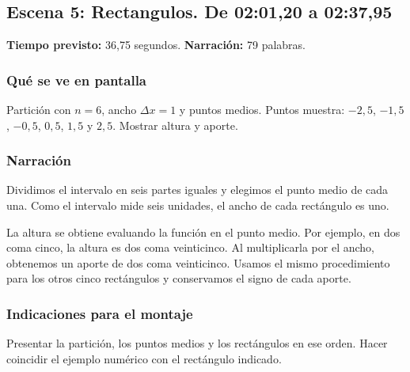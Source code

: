 \documentclass[11pt,a4paper]{article}
\newcommand{\escena}[4]{\textbf{Escena #1: #2.} De #3 a #4}
\begin{document}
\noindent\begin{minipage}[t]{\textwidth}
\subsection*{\escena{5}{Rectangulos}{02:01,20}{02:37,95}}

\textbf{Tiempo previsto:} 36,75 segundos. \textbf{Narración:} 79 palabras.

\subsubsection*{Qué se ve en pantalla}
Partición con $n=6$, ancho $\Delta x=1$ y puntos medios. Puntos muestra: $-2{,}5$, $-1{,}5$, $-0{,}5$, $0{,}5$, $1{,}5$ y $2{,}5$. Mostrar altura y aporte.

\subsubsection*{Narración}
Dividimos el intervalo en seis partes iguales y elegimos el punto medio de cada una. Como el intervalo mide seis unidades, el ancho de cada rectángulo es uno.

La altura se obtiene evaluando la función en el punto medio. Por ejemplo, en dos coma cinco, la altura es dos coma veinticinco. Al multiplicarla por el ancho, obtenemos un aporte de dos coma veinticinco. Usamos el mismo procedimiento para los otros cinco rectángulos y conservamos el signo de cada aporte.

\subsubsection*{Indicaciones para el montaje}
Presentar la partición, los puntos medios y los rectángulos en ese orden. Hacer coincidir el ejemplo numérico con el rectángulo indicado.
\end{minipage}\par\medskip
\end{document}
